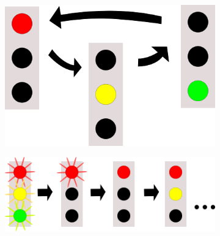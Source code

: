 \label{led-anzeige}
\begin{figure}
  \centering
  \begin{subfigure}[b]{0.29\textwidth}
    \includegraphics[width=\textwidth,keepaspectratio]
                    {./040-komponenten/010-hardware/led-default.png}
    \caption{\label{fig:led-init}}
  \end{subfigure}
  \hspace{0.1\textwidth}
  \begin{subfigure}[b]{0.46\textwidth}
    \includegraphics[width=\textwidth,keepaspectratio]{./040-komponenten/010-hardware/led-start.png}
    \caption{\label{fig:led-start}}
  \end{subfigure}
  

\end{figure}
